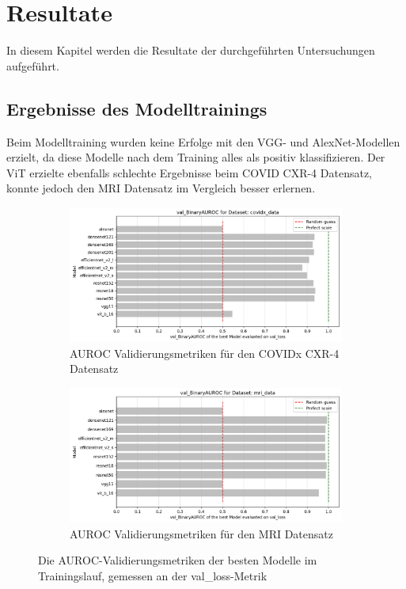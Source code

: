 \section{Resultate}
In diesem Kapitel werden die Resultate der durchgeführten Untersuchungen aufgeführt.

\subsection{Ergebnisse des Modelltrainings} \label{chap:ergebnisse-modelltraining}
Beim Modelltraining wurden keine Erfolge mit den VGG- und AlexNet-Modellen erzielt, da diese Modelle nach dem Training alles als positiv klassifizieren. Der ViT erzielte ebenfalls schlechte Ergebnisse beim COVID CXR-4 Datensatz, konnte jedoch den MRI Datensatz im Vergleich besser erlernen.

\begin{figure}[H]
    \centering
    \begin{subfigure}{0.49\linewidth}
        \centering
        \includegraphics[height=0.49\linewidth]{01-images/05-resultate/val_binaryAUROC_COVIDX.png}
        \caption{AUROC Validierungsmetriken für den COVIDx CXR-4 Datensatz}
    \end{subfigure}\hfill%
    \centering
    \begin{subfigure}{0.49\linewidth}
        \centering
        \includegraphics[height=0.49\linewidth]{01-images/05-resultate/val_binaryAUROC_MRI.png}
        \caption{AUROC Validierungsmetriken für den MRI Datensatz}
    \end{subfigure}
    \caption{Die AUROC-Validierungsmetriken der besten Modelle im Trainingslauf, gemessen an der val\_loss-Metrik}
    \label{fig:result-val-train}
\end{figure}

